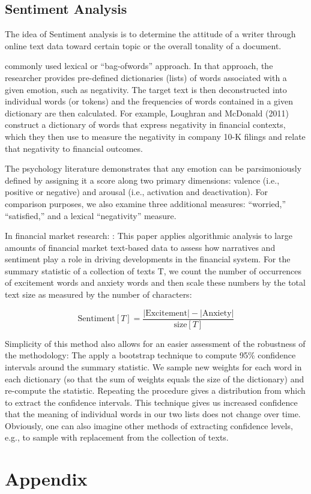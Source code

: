 \documentclass[12pt,a4paper,notitlepage]{article}
\begin{document}
\subsection{Sentiment Analysis}

The idea of Sentiment analysis is to determine the attitude of a writer through online text data toward certain topic or the overall tonality of a document.

commonly used lexical or “bag-ofwords” approach. In that approach, the researcher provides pre-defined dictionaries (lists) of words associated with a given emotion, such as negativity. The target text is then deconstructed into individual words (or tokens) and the frequencies of words contained in a given dictionary are then calculated. For example, Loughran and McDonald (2011) construct a dictionary of words that express negativity in financial contexts, which they then use to measure the negativity in company 10-K filings and relate that negativity to financial outcomes.

The psychology literature demonstrates that any emotion can be parsimoniously defined by assigning it a score along two primary dimensions: valence (i.e., positive or negative) and arousal (i.e., activation and deactivation). For comparison purposes, we also examine three additional measures: “worried,” “satisfied,” and a lexical “negativity” measure. 

In financial market research: 
\citep{nyman_news_2018}: This paper applies algorithmic analysis to large amounts of financial market text-based data to assess how narratives and sentiment play a role in driving developments in the financial system. For the summary statistic of a collection of texts T, we count the number of occurrences of excitement words and anxiety words and then scale these numbers by the total text size as measured by the number of characters: 

\begin{equation}
	\text{Sentiment}[T]=\frac{|\text{Excitement}|-|\text{Anxiety}|}{\text{size}[T]}
\end{equation}

Simplicity of this method also allows for an easier assessment of the robustness of the methodology: The apply a bootstrap technique to compute 95\% confidence intervals around the summary statistic. We sample new weights for each word in each dictionary (so that the sum of weights equals the size of the dictionary) and re-compute the statistic. Repeating the procedure gives a distribution from which to extract the confidence intervals. This technique gives us increased confidence that the meaning of individual words in our two lists does not change over time. Obviously, one can also imagine other methods of extracting confidence levels, e.g., to sample with replacement from the collection of texts.

\section*{Appendix}
\end{document}
